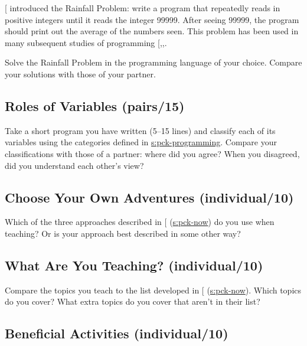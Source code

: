 {[}\protect[\hyperlink{b:Solo1986}{Solo1986}]{]} introduced the Rainfall Problem: write a program that
repeatedly reads in positive integers until it reads the integer 99999.
After seeing 99999, the program should print out the average of the
numbers seen. This problem has been used in many subsequent studies of
programming {[},,\protect[\hyperlink{b:Sepp2015}{Sepp2015}]{]}.

Solve the Rainfall Problem in the programming language of your choice.
Compare your solutions with those of your partner.

\subsection{Roles of Variables (pairs/15)}\label{roles-of-variables-pairs15}

Take a short program you have written (5--15 lines) and classify each of
its variables using the categories defined in
\protect\hyperlink{SECTION}{s:pck-programming}. Compare your classifications with those
of a partner: where did you agree? When you disagreed, did you
understand each other's view?

\subsection{Choose Your Own Adventures (individual/10)}\label{choose-your-own-adventures-individual10}

Which of the three approaches described in {[}\protect[\hyperlink{b:Sorv2014}{Sorv2014}]{]}
(\protect\hyperlink{SECTION}{s:pck-now}) do you use when teaching? Or is your approach
best described in some other way?

\subsection{What Are You Teaching? (individual/10)}\label{what-are-you-teaching-individual10}

Compare the topics you teach to the list developed in {[}\protect[\hyperlink{b:Luxt2017}{Luxt2017}]{]}
(\protect\hyperlink{SECTION}{s:pck-now}). Which topics do you cover? What extra topics
do you cover that aren't in their list?

\subsection{Beneficial Activities (individual/10)}\label{beneficial-activities-individual10}

